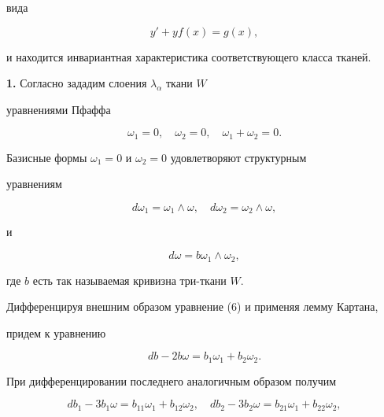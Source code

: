 вида 


\begin{equation} 


y'+y f(x)=g(x), 


\end{equation} 


и находится инвариантная характеристика соответствующего класса тканей. 


\medskip 


 


{\bf 1.} Согласно \cite{1} зададим слоения $\lambda_\alpha$ ткани $W$ 


уравнениями Пфаффа 


\begin{equation} 


\omega_1=0,\quad \omega_2=0,\quad \omega_1+\omega_2=0. 


\end{equation} 


Базисные формы $\omega_1=0$ и $\omega_2=0$ удовлетворяют структурным 


уравнениям 


\begin{equation} 


d\omega_1=\omega_1\wedge\omega,\quad d\omega_2=\omega_2\wedge\omega, 


\end{equation} 


и 


\begin{equation} 


d\omega=b\omega_1\wedge\omega_2, 


\end{equation} 


где $b$ есть так называемая кривизна три-ткани $W$. 


 


Дифференцируя внешним образом уравнение (6) и применяя лемму Картана, 


придем к уравнению 


\begin{equation} 


d b-2b\omega=b_1\omega_1+b_2\omega_2. 


\end{equation} 


При дифференцировании последнего аналогичным образом получим 


\begin{equation} 


d b_1-3b_1\omega=b_{11}\omega_1+b_{12}\omega_2,\quad 


d b_2-3b_2\omega=b_{21}\omega_1+b_{22}\omega_2, 


\end{equation} 


